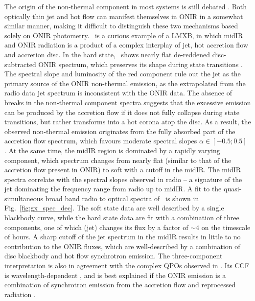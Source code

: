 The origin of the non-thermal component in most systems is still debated \citep{Uttley2014, Poutanen2014a}.
Both optically thin jet and hot flow can manifest themselves in \gls{ONIR} in a somewhat similar manner, making it difficult to distinguish these two mechanisms based solely on \gls{ONIR} photometry.
\GX\ is a curious example of a \gls{LMXB}, in which \gls{midIR} and \gls{ONIR} radiation is a product of a complex interplay of jet, hot accretion flow and accretion disc.
In the hard state, \GX\ shows nearly flat de-reddened disc-subtracted \gls{ONIR} spectrum, which preserves its shape during state transitions \paperVp.
The spectral slope and luminosity of the red component rule out the jet as the primary source of the \gls{ONIR} non-thermal emission, as the extrapolated from the radio data jet spectrum \citep{Blandford1979} is inconsistent with the \gls{ONIR} data.
The absence of breaks in the non-thermal component spectra suggests that the excessive emission can be produced by the accretion flow if it does not fully collapse during state transitions, but rather transforms into a hot corona atop the disc.
As a result, the observed non-thermal emission originates from the fully absorbed part of the accretion flow spectrum, which favours moderate spectral slopes $\alpha \in [-0.5;0.5]$ \citep{Poutanen2014a}.
At the same time, the \gls{midIR} region is dominated by a rapidly varying component, which spectrum changes from nearly flat (similar to that of the accretion flow present in \gls{ONIR}) to soft with a cutoff in the \gls{midIR}.
The \gls{midIR} spectra correlate with the spectral slopes observed in radio -- a signature of the jet dominating the frequency range from radio up to \gls{midIR}.
A fit to the quasi-simultaneous broad band radio to optical spectra of \GX\ is shown in Fig.~\ref{fig:gx_spec_dec}.
The soft state data are well described by a single blackbody curve, while the hard state data are fit with a combination of three components, one of which (jet) changes its flux by a factor of $\sim 4$ on the timescale of hours.
A sharp cutoff of the jet spectrum in the \gls{midIR} results in little to no contribution to the \gls{ONIR} fluxes, which are well-described by a combination of disc blackbody and hot flow synchrotron emission.
The three-component interpretation is also in agreement with the complex \glspl{QPO} observed in \GX.
Its \gls{CCF} is wavelength-dependent \citep{Gandhi2010,Gandhi2011}, and is best explained if the \gls{ONIR} emission is a combination of synchrotron emission from the accretion flow and reprocessed radiation \citep{Veledina2011}.


